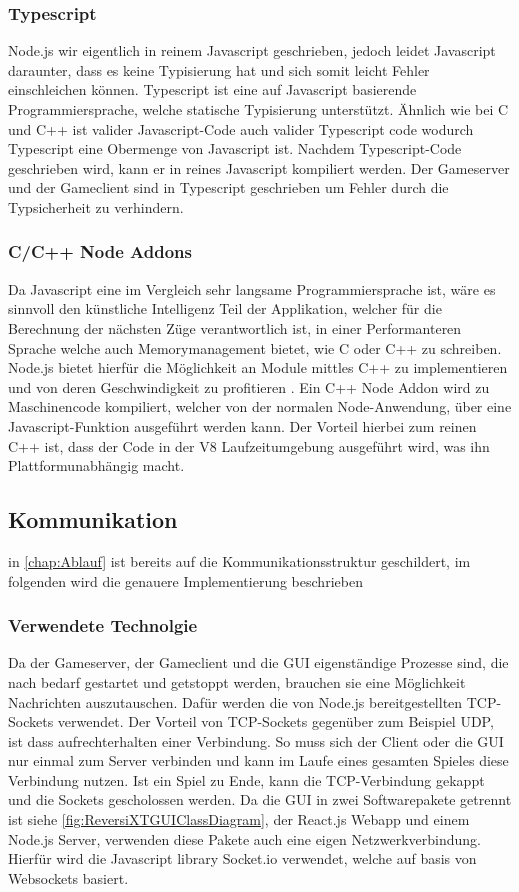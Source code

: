 \documentclass[12pt,a4paper,bibliography=totocnumbered,listof=totocnumbered]{article}
\begin{document}
\subsubsection{Typescript}
Node.js wir eigentlich in reinem Javascript geschrieben, jedoch leidet Javascript daraunter, dass es keine Typisierung hat und sich somit leicht Fehler 
einschleichen können. Typescript ist eine auf Javascript basierende Programmiersprache, welche statische Typisierung unterstützt. 
Ähnlich wie bei C und C++ ist valider Javascript-Code auch valider Typescript code wodurch Typescript eine Obermenge von Javascript ist.
Nachdem Typescript-Code geschrieben wird, kann er in reines Javascript kompiliert werden. 
Der Gameserver und der Gameclient sind in Typescript geschrieben um Fehler durch die Typsicherheit zu verhindern. 

\subsubsection{C/C++ Node Addons}
Da Javascript eine im Vergleich sehr langsame Programmiersprache ist, wäre es sinnvoll den künstliche Intelligenz Teil der Applikation, welcher für die 
Berechnung der nächsten Züge verantwortlich ist, in einer Performanteren Sprache welche auch Memorymanagement bietet, wie C oder C++ zu schreiben. 
Node.js bietet hierfür die Möglichkeit an
Module mittles C++ zu implementieren und von deren Geschwindigkeit zu profitieren \cite{NodeC++Performance}. Ein C++ Node Addon wird zu Maschinencode kompiliert, welcher von der
normalen Node-Anwendung, über eine Javascript-Funktion ausgeführt werden kann. Der Vorteil hierbei zum reinen C++ ist, dass der Code in der V8 
Laufzeitumgebung ausgeführt wird, was ihn Plattformunabhängig macht. \cite{C++Node}


\subsection{Kommunikation}
in \ref{chap:Ablauf} ist bereits auf die Kommunikationsstruktur geschildert, im folgenden wird die genauere Implementierung beschrieben

\subsubsection{Verwendete Technolgie}
Da der Gameserver, der Gameclient und die GUI eigenständige Prozesse sind, die nach bedarf gestartet und getstoppt werden, brauchen sie eine 
Möglichkeit Nachrichten auszutauschen. Dafür werden die von Node.js bereitgestellten TCP-Sockets verwendet. Der Vorteil von TCP-Sockets 
gegenüber zum Beispiel UDP, ist dass aufrechterhalten einer Verbindung. So muss sich der Client oder die GUI nur einmal zum Server verbinden 
und kann im Laufe eines gesamten Spieles diese Verbindung nutzen. Ist ein Spiel zu Ende, kann die TCP-Verbindung gekappt und die 
Sockets gescholossen werden. Da die GUI in zwei Softwarepakete getrennt ist siehe \ref{fig:ReversiXTGUIClassDiagram}, der React.js Webapp und einem Node.js Server, verwenden 
diese Pakete auch eine eigen Netzwerkverbindung. Hierfür wird die Javascript library Socket.io verwendet, welche auf basis von Websockets basiert.
\end{document}
